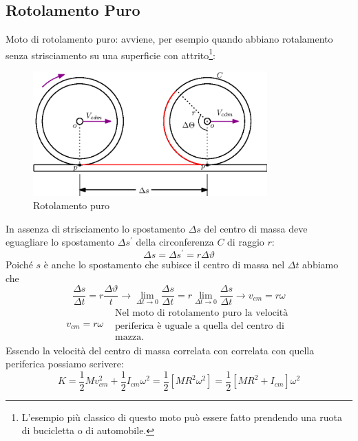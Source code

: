 \documentclass{book}
\begin{document}
\subsection{Rotolamento Puro}
Moto di rotolamento puro: avviene, per esempio quando abbiano rotalamento senza
strisciamento su una superficie con attrito\footnote{L'esempio più classico di questo
moto può essere fatto prendendo una ruota di bucicletta o di automobile.}: 
\begin{figure}[ht]
  \centering
  \includegraphics[width=9cm]{img/finiti/roto-puro.eps}
  \caption{Rotolamento puro}
  \label{fig:roto-puro}
\end{figure}
In assenza di strisciamento lo spostamento $\Delta s$ del centro di massa deve eguagliare
lo spostamento $\Delta s^\prime$ della circonferenza $C$ di raggio $r$:
\begin{equation*}
  \Delta s=\Delta s^\prime=r\Delta \vartheta
\end{equation*}
Poiché $s$ è anche lo spostamento che subisce il centro di massa nel $\Delta t$ abbiamo
che
\begin{equation*}
  \frac{\Delta s}{\Delta t}=r\frac{\Delta \vartheta}{t}\to \lim_{\Delta t\to0}
  \frac{\Delta s}{\Delta t}=r\lim_{\Delta t\to 0}\frac{\Delta s}{\Delta t}\to v_{cm}
  =r\omega
\end{equation*}
\begin{eqnarray*}
  \boxed{v_{cm}=r\omega} & \begin{matrix}
                             \text{Nel moto di rotolamento puro la velocità}\\
                             \text{periferica è uguale a quella del centro di}\\
                             \text{mazza.}
                           \end{matrix}
\end{eqnarray*}
Essendo la velocità del centro di massa correlata con correlata con quella periferica
possiamo scrivere:
\begin{equation}
  K=\frac{1}{2} Mv_{cm}^2+\frac{1}{2}I_{cm}\omega^2=\frac{1}{2}[MR^2\omega^2]=\frac{1}{2}
  [MR^2+I_{cm}]\omega^2
\end{equation}
\end{document}
